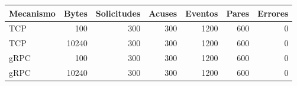 \begin{tabular}{lrrrrrr}
\toprule
Mecanismo & Bytes & Solicitudes & Acuses & Eventos & Pares & Errores \\
\midrule
TCP & 100 & 300 & 300 & 1200 & 600 & 0 \\
TCP & 10240 & 300 & 300 & 1200 & 600 & 0 \\
gRPC & 100 & 300 & 300 & 1200 & 600 & 0 \\
gRPC & 10240 & 300 & 300 & 1200 & 600 & 0 \\
\bottomrule
\end{tabular}
